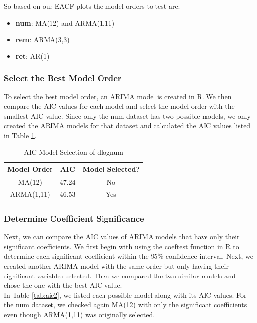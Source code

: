 \documentclass[a4paper]{article}
\begin{document}
So based on our EACF plots the model orders to test are:

\begin{itemize}
    \item \textbf{num}: MA(12) and ARMA(1,11)
    \item \textbf{rem}: ARMA(3,3)
    \item \textbf{ret}: AR(1)
\end{itemize}

\subsubsection{Select the Best Model Order}

To select the best model order, an ARIMA model is created in R. We then compare the AIC values for each model and select the model order with the smallest AIC value. Since only the num dataset has two possible models, we only created the ARIMA models for that dataset and calculated the AIC values listed in Table \ref{tab:aic1}. \\

\begin{table}[h!]
    \centering
    \caption{AIC Model Selection of dlognum}
    \begin{tabular}{|c|c|c|}
    \hline
    Model Order & AIC & Model Selected? \\
    \hline
    MA(12) & 47.24 & No \\ 
    \hline
    ARMA(1,11) & 46.53 & Yes \\
    \hline
    \end{tabular}
    \label{tab:aic1}
\end{table}

\subsubsection{Determine Coefficient Significance}
\label{section:coef}

Next, we can compare the AIC values of ARIMA models that have only their significant coefficients. We first begin with using the coeftest function in R to determine each significant coefficient within the 95\% confidence interval. Next, we created another ARIMA model with the same order but only having their significant variables selected. Then we compared the two similar models and chose the one with the best AIC value. \\

In Table \ref{tab:aic2}, we listed each possible model along with its AIC values. For the num dataset, we checked again MA(12) with only the significant coefficients even though ARMA(1,11) was originally selected.
\end{document}
